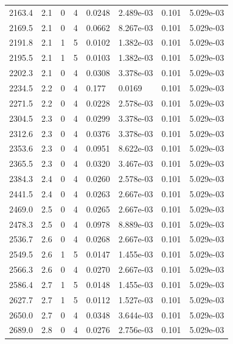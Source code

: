 \documentclass[preview]{standalone}
\begin{document}
{{{{\begin{tabular}{L{1.2cm}C{1.2cm} C{0.3cm}C{0.5cm} C{1.4cm}C{1.4cm} C{1.4cm}C{1.4cm}}
  2163.4  &   2.1  & 0     &  4 &  0.0248  & 2.489e-03  & 0.101 &  5.029e-03   \\ 
  2169.5  &   2.1  & 0     &  4 &  0.0662  & 8.267e-03  & 0.101 &  5.029e-03   \\ 
  2191.8  &   2.1  & 1     &  5 &  0.0102  & 1.382e-03  & 0.101 &  5.029e-03   \\ 
  2195.5  &   2.1  & 1     &  5 &  0.0103  & 1.382e-03  & 0.101 &  5.029e-03   \\ 
  2202.3  &   2.1  & 0     &  4 &  0.0308  & 3.378e-03  & 0.101 &  5.029e-03   \\ 
  2234.5  &   2.2  & 0     &  4 &  0.177  & 0.0169  & 0.101 &  5.029e-03   \\ 
  2271.5  &   2.2  & 0     &  4 &  0.0228  & 2.578e-03  & 0.101 &  5.029e-03   \\ 
  2304.5  &   2.3  & 0     &  4 &  0.0299  & 3.378e-03  & 0.101 &  5.029e-03   \\ 
  2312.6  &   2.3  & 0     &  4 &  0.0376  & 3.378e-03  & 0.101 &  5.029e-03   \\ 
  2353.6  &   2.3  & 0     &  4 &  0.0951  & 8.622e-03  & 0.101 &  5.029e-03   \\ 
  2365.5  &   2.3  & 0     &  4 &  0.0320  & 3.467e-03  & 0.101 &  5.029e-03   \\ 
  2384.3  &   2.4  & 0     &  4 &  0.0260  & 2.578e-03  & 0.101 &  5.029e-03   \\ 
  2441.5  &   2.4  & 0     &  4 &  0.0263  & 2.667e-03  & 0.101 &  5.029e-03   \\ 
  2469.0  &   2.5  & 0     &  4 &  0.0265  & 2.667e-03  & 0.101 &  5.029e-03   \\ 
  2478.3  &   2.5  & 0     &  4 &  0.0978  & 8.889e-03  & 0.101 &  5.029e-03   \\ 
  2536.7  &   2.6  & 0     &  4 &  0.0268  & 2.667e-03  & 0.101 &  5.029e-03   \\ 
  2549.5  &   2.6  & 1     &  5 &  0.0147  & 1.455e-03  & 0.101 &  5.029e-03   \\ 
  2566.3  &   2.6  & 0     &  4 &  0.0270  & 2.667e-03  & 0.101 &  5.029e-03   \\ 
  2586.4  &   2.7  & 1     &  5 &  0.0148  & 1.455e-03  & 0.101 &  5.029e-03   \\ 
  2627.7  &   2.7  & 1     &  5 &  0.0112  & 1.527e-03  & 0.101 &  5.029e-03   \\ 
  2650.0  &   2.7  & 0     &  4 &  0.0348  & 3.644e-03  & 0.101 &  5.029e-03   \\ 
  2689.0  &   2.8  & 0     &  4 &  0.0276  & 2.756e-03  & 0.101 &  5.029e-03   \\ 

\end{tabular}}}}}
\end{document}
